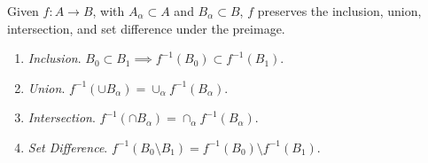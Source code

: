   \begin{theorem}
    \label{preserve_preimage}
    Given $f: A \rightarrow B$, with $A_\alpha \subset A$ and $B_\alpha \subset B$, $f$ preserves the inclusion, union, intersection, and set difference under the preimage. 
    \begin{enumerate}
      \item \textit{Inclusion}. $B_0 \subset B_1 \implies f^{-1} (B_0) \subset f^{-1} (B_1)$. 
      \item \textit{Union}. $f^{-1} (\cup B_\alpha) = \cup_\alpha f^{-1} (B_\alpha)$. 
      \item \textit{Intersection}. $f^{-1} (\cap B_\alpha) = \cap_\alpha f^{-1} (B_\alpha)$.
      \item \textit{Set Difference}. $f^{-1}(B_0 \setminus B_1) = f^{-1} (B_0) \setminus f^{-1} (B_1)$. 
    \end{enumerate}
  \end{theorem} 
